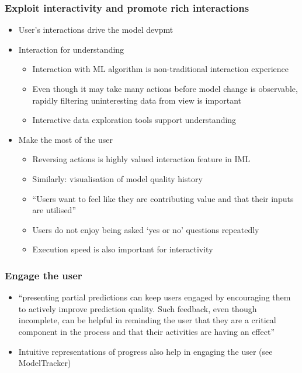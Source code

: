 \documentclass[12pt,a4paper]{article}
\begin{document}
\subsubsection{Exploit interactivity and promote rich interactions}
\begin{itemize}
\item User's interactions drive the model devpmt
\item Interaction for understanding
\begin{itemize}
\item Interaction with ML algorithm is non-traditional interaction experience
\item Even though it may take many actions before model change is observable, rapidly filtering uninteresting data from view is important
\item Interactive data exploration tools support understanding 
\end{itemize}
\item Make the most of the user
\begin{itemize}
\item Reversing actions is highly valued interaction feature in IML
\item Similarly: visualisation of model quality history
\item ``Users want to feel like they are contributing value and that their inputs are utilised''
\item Users do not enjoy being asked `yes or no' questions repeatedly
\item Execution speed is also important for interactivity
\end{itemize}
\end{itemize}
\subsubsection{Engage the user}
\begin{itemize}
\item ``presenting partial predictions can keep users engaged by encouraging them to actively improve prediction quality. Such feedback, even though incomplete, can be helpful in reminding the user that they are a critical component in the process and that their activities are having an effect''
\item Intuitive representations of progress also help in engaging the user (see ModelTracker)
\end{itemize}
%
%
\end{document}
